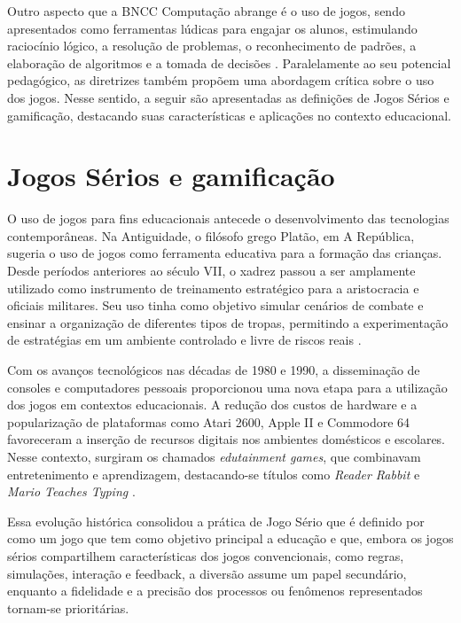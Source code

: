 Outro aspecto que a BNCC Computação abrange é o uso de jogos, sendo apresentados
como ferramentas lúdicas para engajar os alunos, estimulando raciocínio lógico,
a resolução de problemas, o reconhecimento de padrões, a elaboração de
algoritmos e a tomada de decisões \cite{brasil_bncc_computacao}. Paralelamente
ao seu potencial pedagógico, as diretrizes também propõem uma abordagem crítica
sobre o uso dos jogos. Nesse sentido, a seguir são apresentadas as definições de
Jogos Sérios e gamificação, destacando suas características e aplicações no
contexto educacional.




\section{Jogos Sérios e gamificação}
O uso de jogos para fins educacionais antecede o desenvolvimento das tecnologias
contemporâneas. Na Antiguidade, o filósofo grego Platão, em A República, sugeria
o uso de jogos como ferramenta educativa para a formação das crianças. Desde
períodos anteriores ao século VII, o xadrez passou a ser amplamente utilizado
como instrumento de treinamento estratégico para a aristocracia e oficiais
militares. Seu uso tinha como objetivo simular cenários de combate e ensinar a
organização de diferentes tipos de tropas, permitindo a experimentação de
estratégias em um ambiente controlado e livre de riscos reais \cite{michael2006seriousgame}.


Com os avanços tecnológicos nas décadas de 1980 e 1990, a disseminação
de consoles e computadores pessoais proporcionou uma nova etapa para a
utilização dos jogos em contextos educacionais. A redução dos custos de hardware
e a popularização de plataformas como Atari 2600, Apple II e Commodore 64
favoreceram a inserção de recursos digitais nos ambientes domésticos e
escolares. Nesse contexto, surgiram os chamados \textit{edutainment games}, que
combinavam entretenimento e aprendizagem, destacando-se títulos como \textit{Reader
Rabbit} e \textit{Mario Teaches Typing} \cite{michael2006seriousgame}.


Essa evolução histórica consolidou a prática de Jogo Sério que é definido por
\cite{michael2006seriousgame} como um jogo que tem como objetivo principal a
educação e que, embora os jogos sérios compartilhem características dos
jogos convencionais, como regras, simulações, interação e feedback, a diversão
assume um papel secundário, enquanto a fidelidade e a precisão dos processos ou
fenômenos representados tornam-se prioritárias.


